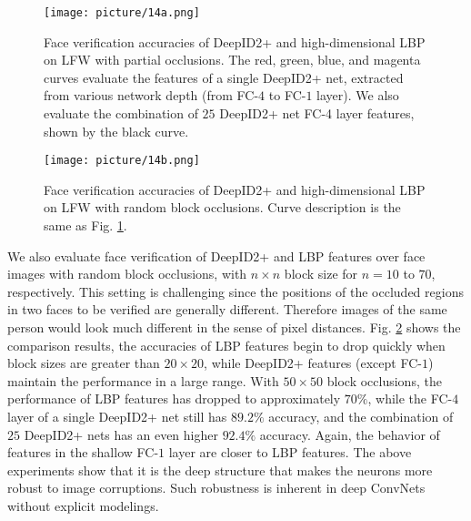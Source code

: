 \documentclass[10pt,twocolumn,letterpaper]{article}
\begin{document}
\begin{figure}[t]
\begin{center}
\texttt{[image: picture/14a.png]}
\end{center}
\vspace{-0.15in}
\caption{Face verification accuracies of DeepID2+ and high-dimensional LBP on LFW with partial occlusions. The red, green, blue, and magenta curves evaluate the features of a single DeepID2+ net, extracted from various network depth (from FC-$4$ to FC-$1$ layer). We also evaluate the combination of $25$ DeepID2+ net FC-4 layer features, shown by the black curve.}
\label{fig:accu_occlu}
\vspace{-0.15in}
\end{figure}

\begin{figure}[t]
\begin{center}
\texttt{[image: picture/14b.png]}
\end{center}
\vspace{-0.15in}
\caption{Face verification accuracies of DeepID2+ and high-dimensional LBP on LFW with random block occlusions. Curve description is the same as Fig. \ref{fig:accu_occlu}.}
\label{fig:accu_rb}
\vspace{-0.15in}
\end{figure}

We also evaluate face verification of DeepID2+ and LBP features over face images with random block occlusions, with $n\times n$ block size for $n=10$ to $70$, respectively. This setting is challenging since the positions of the occluded regions in two faces to be verified are generally different. Therefore images of the same person would look much different in the sense of pixel distances. Fig. \ref{fig:accu_rb} shows the comparison results, the accuracies of LBP features begin to drop quickly when block sizes are greater than $20\times20$, while DeepID2+ features (except FC-$1$) maintain the performance in a large range. With $50\times50$ block occlusions, the performance of LBP features has dropped to approximately $70\%$, while the FC-$4$ layer of a single DeepID2+ net still has $89.2\%$ accuracy, and the combination of $25$ DeepID2+ nets has an even higher $92.4\%$ accuracy. Again, the behavior of features in the shallow FC-$1$ layer are closer to LBP features. The above experiments show that it is the deep structure that makes the neurons more robust to image corruptions. Such robustness is inherent in deep ConvNets without explicit modelings.
\end{document}
